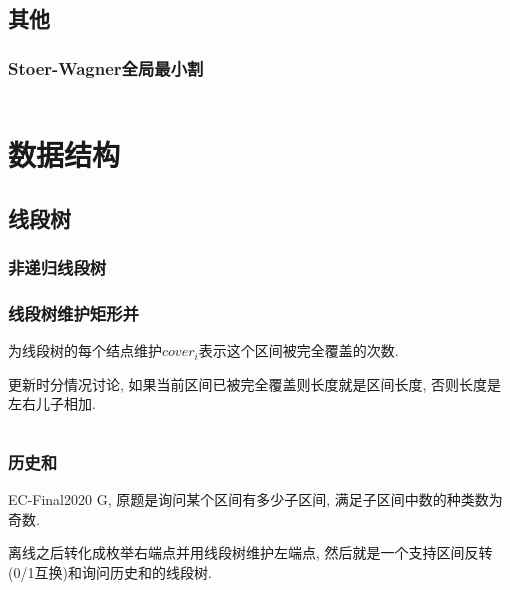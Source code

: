 \documentclass[a4paper, twoside]{article}
\begin{document}
\begin{multicols}{2}
			\subsection{其他}
				\subsubsection{Stoer-Wagner全局最小割}
					\inputminted{cpp}{../src/graph/stoer-wagner.cpp}



			
		\newpage
		\section{数据结构}

			\subsection{线段树}
				\subsubsection{非递归线段树}
					
				
				\subsubsection{线段树维护矩形并}
					为线段树的每个结点维护$cover_i$表示这个区间被完全覆盖的次数.

					更新时分情况讨论, 如果当前区间已被完全覆盖则长度就是区间长度, 否则长度是左右儿子相加.
					\inputminted{cpp}{../src/datastructure/线段树维护矩形并.cpp}
				
				\subsubsection{历史和}

					EC-Final2020 G, 原题是询问某个区间有多少子区间, 满足子区间中数的种类数为奇数.

					离线之后转化成枚举右端点并用线段树维护左端点, 然后就是一个支持区间反转(0/1互换)和询问历史和的线段树.


\end{multicols}
\end{document}
